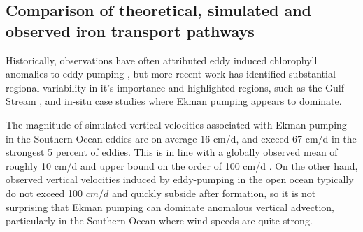 \documentclass{article}
\begin{document}
   
    
\subsection{Comparison of theoretical, simulated and observed iron transport pathways}
    
Historically, observations have often attributed eddy induced chlorophyll anomalies to eddy pumping \parencite{FalkowskiRoleeddypumping1991,SiegelMesoscaleeddiessatellite1999, McGillicuddyInfluencemesoscaleeddies1998}, but more recent work has identified substantial regional variability in it's importance \parencite{GaubeRegionalvariationsinfluence2014, GaubeSatelliteObservationsMesoscale2014} and highlighted regions, such as the Gulf Stream \parencite{GaubeinfluenceGulfStream2017, ZhangImpactsMesoscaleEddies2018}, and in-situ case studies \textcite{McGillicuddyEddywindinteractions2007} where Ekman pumping appears to dominate. 
    
The magnitude of simulated vertical velocities associated with Ekman pumping in the Southern Ocean eddies are on average 16 cm/d, and exceed 67 cm/d in the strongest 5 percent of eddies. This is in line with a globally observed mean of roughly 10 cm/d \parencite{GaubeSatelliteObservationsMesoscale2014} and upper bound on the order of 100 cm/d \parencite{MartinMechanismsverticalnutrient2001}. On the other hand, observed vertical velocities induced by eddy-pumping in the open ocean typically do not exceed 100 $cm/d$ \parencite{SiegelMesoscaleeddiessatellite1999,GaubeSatelliteObservationsMesoscale2014} and quickly subside after formation, so it is not surprising that Ekman pumping can dominate anomalous vertical advection, particularly in the Southern Ocean where wind speeds are quite strong. 
\end{document}
